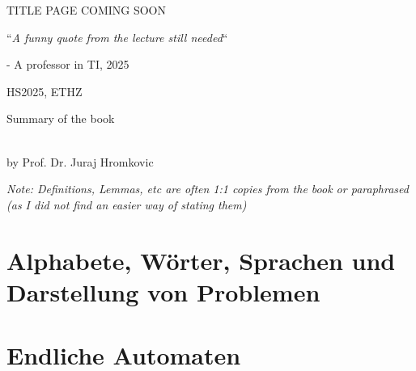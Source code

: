 \documentclass{article}
\begin{document}
\startDocument
\usetcolorboxes

\vspace{2cm}
\begin{Huge}
    \begin{center}
        TITLE PAGE COMING SOON
    \end{center}
\end{Huge}


\vspace{4cm}
\begin{center}
    \begin{Large}
        ``\textit{A funny quote from the lecture still needed}``
    \end{Large}

    \hspace{3cm} - A professor in TI, 2025
\end{center}

\vspace{3cm}
\begin{center}
    HS2025, ETHZ\\[0.2cm]
    \begin{Large}
        Summary of the book \color{MidnightBlue}\color{black} 
    \end{Large}\\[0.2cm]
    by Prof. Dr. Juraj Hromkovic
\end{center}

\newpage


\begin{scriptsize}
    \textit{Note: Definitions, Lemmas, etc are often 1:1 copies from the book or paraphrased (as I did not find an easier way of stating them)}
\end{scriptsize}

\newpage





\newsection
\section{Alphabete, Wörter, Sprachen und Darstellung von Problemen}





\newsection
\section{Endliche Automaten}

\end{document}
